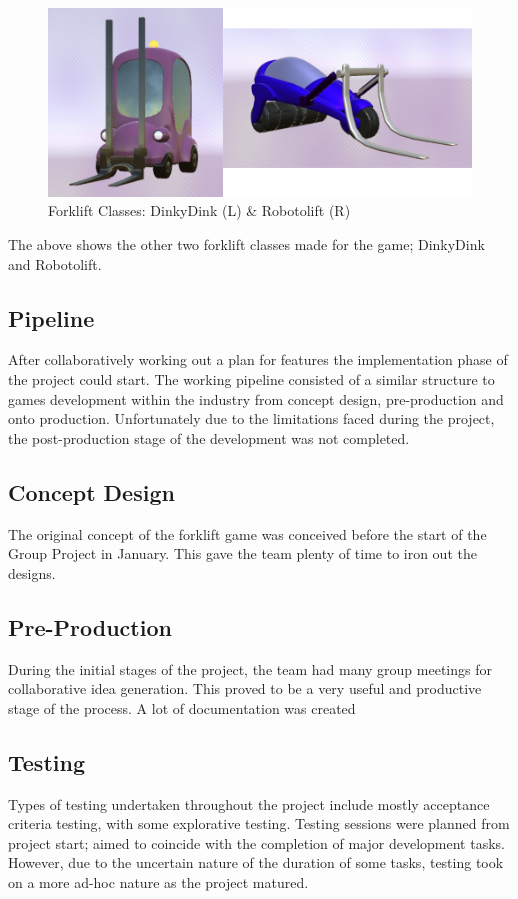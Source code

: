 \documentclass[12pt]{article}
\begin{document}
\begin{figure}[H]
	\caption{Forklift Classes: DinkyDink (L) \& Robotolift (R)}
	\includegraphics[width=\textwidth]{images/dinkyRobo}
\end{figure}
The above shows the other two forklift classes made for the game; DinkyDink and Robotolift. 


\subsection{Pipeline}

After collaboratively working out a plan for features the implementation phase of the project could start. The working pipeline consisted of a similar structure to games development within the industry from concept design, pre-production and onto production. Unfortunately due to the limitations faced during the project, the post-production stage of the development was not completed.

\subsection{Concept Design}

The original concept of the forklift game was conceived before the start of the Group Project in January. This gave the team plenty of time to iron out the designs.

\subsection{Pre-Production}

During the initial stages of the project, the team had many group meetings for collaborative idea generation. This proved to be a very useful and productive stage of the process. A lot of documentation was created 


\subsection{Testing}
Types of testing undertaken throughout the project include mostly acceptance criteria testing, with some explorative testing. Testing sessions were planned from project start; aimed to coincide with the completion of major development tasks. However, due to the uncertain nature of the duration of some tasks, testing took on a more ad-hoc nature as the project matured. 
\end{document}
